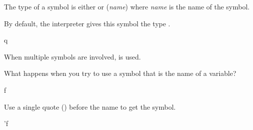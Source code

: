 {{{{{{{{The type of a symbol is either 
or ({\it name}) where {\it name} is the name
of the symbol.

\begin{xtc}
\begin{xtccomment}
By default, the interpreter
gives this symbol the type .
\end{xtccomment}
\begin{spadsrc}
q
\end{spadsrc}
\begin{TeXOutput}
\begin{fricasmath}{9}
%
\end{fricasmath}
\end{TeXOutput}
\end{xtc}
\begin{xtc}
\begin{xtccomment}
When multiple symbols are involved,  is used.
\end{xtccomment}
\begin{spadsrc}
[q, r]
\end{spadsrc}
\begin{TeXOutput}
\begin{fricasmath}{10}
%
\end{fricasmath}
\end{TeXOutput}
\end{xtc}

\begin{xtc}
\begin{xtccomment}
What happens when you try to use a symbol that is the name of a variable?
\end{xtccomment}
\begin{spadsrc}
f 
\end{spadsrc}
\begin{TeXOutput}
\begin{fricasmath}{11}
%
\end{fricasmath}
\end{TeXOutput}
\end{xtc}
\begin{xtc}
\begin{xtccomment}
Use a single quote () before
the name to get the symbol.
\end{xtccomment}
\begin{spadsrc}
'f
\end{spadsrc}
\begin{TeXOutput}
\begin{fricasmath}{12}
%
\end{fricasmath}
\end{TeXOutput}
\end{xtc}

}}}}}}}}
